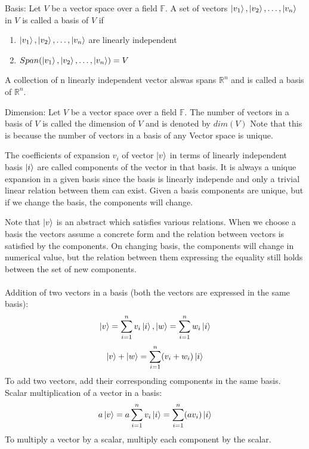 \begin{definition}
    Basis: Let $V$ be a vector space over a field $\mathbb{F}$. A set of vectors $\ket{v_1},\ket{v_2},\ldots,\ket{v_n}$ in $V$ is called a basis of $V$ if
    \begin{enumerate}
        \item $\ket{v_1},\ket{v_2},\ldots,\ket{v_n}$ are linearly independent
        \item $Span(\ket{v_1},\ket{v_2},\ldots,\ket{v_n})=V$
    \end{enumerate}
\end{definition}

\begin{example}
    A collection of n linearly independent vector alswas spans $\mathbb{R}^n$ and is called a basis of $\mathbb{R}^n$.
\end{example}

\begin{definition}
    Dimension: Let $V$ be a vector space over a field $\mathbb{F}$. The number of vectors in a basis of $V$ is called the dimension of $V$ and is denoted by $dim(V)$
    Note that this is because the number of vectors in a basis of any Vector space is unique.
\end{definition}

\begin{theorem}
    The coefficients of expansion $v_i$ of vector $\ket{v}$ in terms of linearly independent basis $\ket{i}$ are called components of the vector in that basis.
    It is always a unique expansion in a given basis since the basis is linearly independe and only a trivial linear relation 
    between them can exist. Given a basis components are unique, but if we change the basis, the components will change.
\end{theorem}

Note that $\ket{v}$ is an abstract which satisfies various relations. When we choose a basis the vectors assume a concrete form and the relation between 
vectors is satisfied by the components. On changing basis, the components will change in numerical value, but the relation between them expressing the equality
still holds between the set of new components. \\
\\
Addition of two vectors in a basis (both the vectors are expressed in the same basis): 
\[
    \ket{v}=\sum_{i=1}^{n}v_i\ket{i}, \ket{w}=\sum_{i=1}^{n}w_i\ket{i}
\]
\[
    \ket{v}+\ket{w}=\sum_{i=1}^{n}(v_i+w_i)\ket{i}
\]
To add two vectors, add their corresponding components in the same basis. \\
Scalar multiplication of a vector in a basis:
\[
    a\ket{v}=a\sum_{i=1}^{n}v_i\ket{i}=\sum_{i=1}^{n}(av_i)\ket{i}
\]
To multiply a vector by a scalar, multiply each component by the scalar. \\

